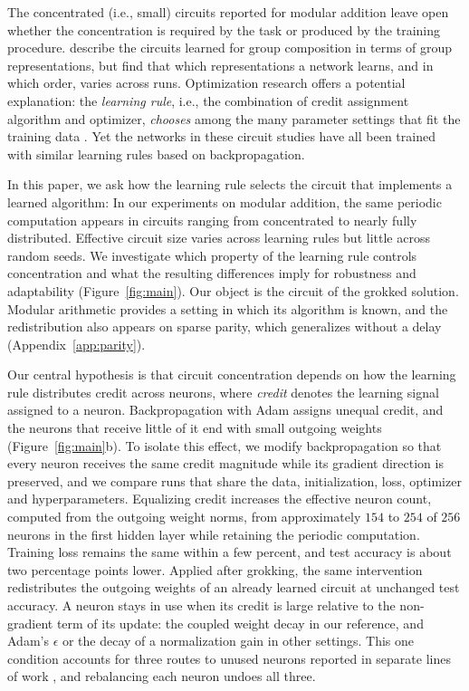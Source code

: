 \documentclass{article} %
\begin{document}
The concentrated (i.e., small) circuits reported for modular addition leave open whether the concentration is required by the task or produced by the training procedure. \citet{chughtai2023toy} describe the circuits learned for group composition in terms of group representations, but find that which representations a network learns, and in which order, varies across runs. Optimization research offers a potential explanation: the \emph{learning rule}, i.e., the combination of credit assignment algorithm and optimizer, \emph{chooses} among the many parameter settings that fit the training data \citep{gunasekar2018implicit,woodworth2020kernel}. Yet the networks in these circuit studies have all been trained with similar learning rules based on backpropagation. 

In this paper, we ask how the learning rule selects the circuit that implements a learned algorithm: In our experiments on modular addition, the same periodic computation appears in circuits ranging from concentrated to nearly fully distributed. Effective circuit size varies across learning rules but little across random seeds. We investigate which property of the learning rule controls concentration and what the resulting differences imply for robustness and adaptability (Figure~\ref{fig:main}). Our object is the circuit of the grokked solution. Modular arithmetic provides a setting in which its algorithm is known, and the redistribution also appears on sparse parity, which generalizes without a delay (Appendix~\ref{app:parity}).

Our central hypothesis is that circuit concentration depends on how the learning rule distributes credit across neurons, where \emph{credit} denotes the learning signal assigned to a neuron. Backpropagation with Adam assigns unequal credit, and the neurons that receive little of it end with small outgoing weights (Figure~\ref{fig:main}b). To isolate this effect, we modify backpropagation so that every neuron receives the same credit magnitude while its gradient direction is preserved, and we compare runs that share the data, initialization, loss, optimizer and hyperparameters. Equalizing credit increases the effective neuron count, computed from the outgoing weight norms, from approximately $154$ to $254$ of $256$ neurons in the first hidden layer while retaining the periodic computation. Training loss remains the same within a few percent, and test accuracy is about two percentage points lower. Applied after grokking, the same intervention redistributes the outgoing weights of an already learned circuit at unchanged test accuracy. A neuron stays in use when its credit is large relative to the non-gradient term of its update: the coupled weight decay in our reference, and Adam's $\epsilon$ or the decay of a normalization gain in other settings. This one condition accounts for three routes to unused neurons reported in separate lines of work \citep{yaguchi2018adam,mehta2019implicit,dufortlabbe2025maxwell,kolb2025dgating}, and rebalancing each neuron undoes all three.
\end{document}
